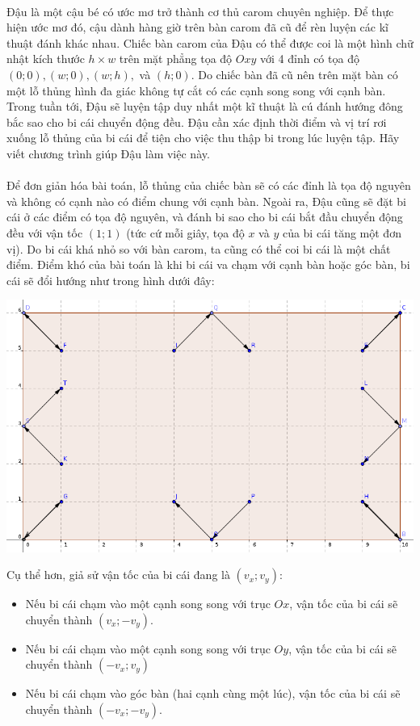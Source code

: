 \documentclass[11pt,a4paper,oneside]{article}
\begin{document}
\\
Đậu là một cậu bé có ước mơ trở thành cơ thủ carom chuyên nghiệp. Để thực hiện ước mơ đó, cậu dành hàng giờ trên bàn carom đã cũ để rèn luyện các kĩ thuật đánh khác nhau. Chiếc bàn carom của Đậu có thể được coi là một hình chữ nhật kích thước $h \times w$ trên mặt phẳng tọa độ $Oxy$ với 4 đỉnh có tọa độ $(0;0), (w;0), (w;h),$ và $(h;0)$. Do chiếc bàn đã cũ nên trên mặt bàn có một lỗ thủng hình đa giác không tự cắt có các cạnh song song với cạnh bàn. Trong tuần tới, Đậu sẽ luyện tập duy nhất một kĩ thuật là cú đánh hướng đông bắc sao cho bi cái chuyển động đều. Đậu cần xác định thời điểm và vị trí rơi xuống lỗ thủng của bi cái để tiện cho việc thu thập bi trong lúc luyện tập. Hãy viết chương trình giúp Đậu làm việc này. \\\\
Để đơn giản hóa bài toán, lỗ thủng của chiếc bàn sẽ có các đỉnh là tọa độ nguyên  và không có cạnh nào có điểm chung với cạnh bàn. Ngoài ra, Đậu cũng sẽ đặt bi cái ở các điểm có tọa độ nguyên, và đánh bi sao cho bi cái bắt đầu chuyển động đều với vận tốc $(1;1)$ (tức cứ mỗi giây, tọa độ $x$ và $y$ của bi cái tăng một đơn vị). Do bi cái khá nhỏ so với bàn carom, ta cũng có thể coi bi cái là một chất điểm. Điểm khó của bài toán là khi bi cái va chạm với cạnh bàn hoặc góc bàn, bi cái sẽ đổi hướng như trong hình dưới đây:
\begin{center}
\includegraphics[scale=0.5]{carom.png}
\end{center}
Cụ thể hơn, giả sử vận tốc của bi cái đang là $(v_x;v_y)$:
\begin{itemize}
\item Nếu bi cái chạm vào một cạnh song song với trục $Ox$, vận tốc của bi cái sẽ chuyển thành $(v_x;-v_y)$.
\item Nếu bi cái chạm vào một cạnh song song với trục $Oy$, vận tốc của bi cái sẽ chuyển thành $(-v_x;v_y)$
\item Nếu bi cái chạm vào góc bàn (hai cạnh cùng một lúc), vận tốc của bi cái sẽ chuyển thành $(-v_x;-v_y)$.
\end{itemize}
\end{document}
